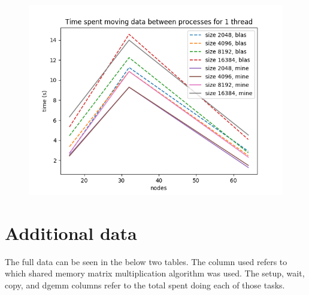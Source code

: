 \documentclass{article}
\begin{document}
\begin{figure}[]
    \centering
    \includegraphics[width=0.8\linewidth]{time_nodes_1_threads.png}
\end{figure}




\appendix

\newpage
\section{Additional data}

The full data can be seen in the below two tables. The column used refers to which shared memory matrix
multiplication algorithm was used. The setup, wait, copy, and dgemm columns refer to the total spent doing
each of those tasks. 
\end{document}
